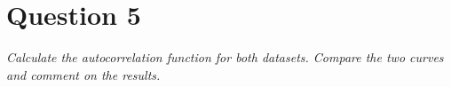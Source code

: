 \section*{Question 5}
\textit{Calculate the autocorrelation function for both datasets. Compare the two curves and comment on the results.}
